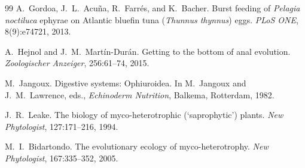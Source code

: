\begin{thebibliography}{99}
A.~Gordoa, J.~L.~Acu\~{n}a, R.~Farr\'{e}s, and K.~Bacher. \newblock Burst feeding of \emph{Pelagia noctiluca} ephyrae on Atlantic bluefin tuna (\emph{Thunnus thynnus}) eggs. \newblock \emph{PLoS ONE}, 8(9):e74721, 2013.

A.~Hejnol and J.~M.~Mart\'{i}n-Dur\'{a}n. \newblock Getting to the bottom of anal evolution. \newblock \emph{Zoologischer Anzeiger}, 256:61--74, 2015.

M.~Jangoux. \newblock Digestive systems: Ophiuroidea. \newblock In M.~Jangoux and J.~M.~Lawrence, eds., \emph{Echinoderm Nutrition}, Balkema, Rotterdam, 1982.

J.~R.~Leake. \newblock The biology of myco-heterotrophic (`saprophytic') plants. \newblock \emph{New Phytologist}, 127:171--216, 1994.

M.~I.~Bidartondo. \newblock The evolutionary ecology of myco-heterotrophy. \newblock \emph{New Phytologist}, 167:335--352, 2005.

\end{thebibliography}


